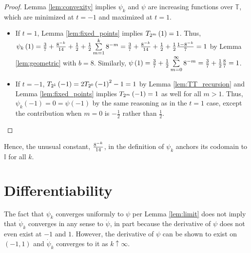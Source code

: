 \begin{proof}
  Lemma \ref{lem:convexity} implies $\psi_k$ and $\psi$ are increasing functions over $\mathbb{T}$, which are minimized at $t = -1$ and maximized at $t = 1$.
  \begin{itemize}
      \item If $t = 1$, Lemma \ref{lem:fixed_points} implies $T_{2^{m}}\left(1\right) = 1$. Thus, $\psi_k\left(1\right) = \frac{3}{7} + \frac{8^{-k}}{14} + \frac{1}{2} + \frac{1}{2} \sum\limits_{m = 1}^k 8^{-m} = \frac{3}{7} + \frac{8^{-k}}{14} + \frac{1}{2} + \frac{1}{2} \frac{1 - 8^{-k}}{7} = 1$ by Lemma \ref{lem:geometric} with $b = 8$. Similarly, $\psi\left(1\right) = \frac{3}{7} + \frac{1}{2} \sum\limits_{m = 0}^\infty 8^{-m} = \frac{3}{7} + \frac{1}{2} \frac{8}{7} = 1$.
      \item If $t = -1$, $T_{2^{1}}\left(-1\right) = 2 T_{2^{0}}\left(-1\right)^2 -1 = 1$ by Lemma \ref{lem:TT_recursion} and Lemma \ref{lem:fixed_points} implies $T_{2^{m}}\left(-1\right) = 1$ as well for all $m > 1$.  Thus, $\psi_k\left(-1\right) = 0 = \psi\left(-1\right)$ by the same reasoning as in the $t = 1$ case, except the contribution when $m = 0$ is $-\frac{1}{2}$ rather than $\frac{1}{2}$.
  \end{itemize}
\end{proof}
\noindent Hence, the unusual constant, $\frac{8^{-k}}{14}$, in the definition of $\psi_k$ anchors its codomain to $\mathbb{I}$ for all $k$.

\section{Differentiability}\label{sec:Differentiability}

The fact that $\psi_k$ converges uniformly to $\psi$ per Lemma \ref{lem:limit} does not imply that $\dot{\psi}_k$ converges in any sense to $\dot{\psi}$, in part because the derivative of $\psi$ does not even exist at $-1$ and $1$. However, the derivative of $\psi$ can be shown to exist on $\left(-1,1\right)$ and $\dot{\psi}_k$ converges to it as $k \uparrow \infty$. 

